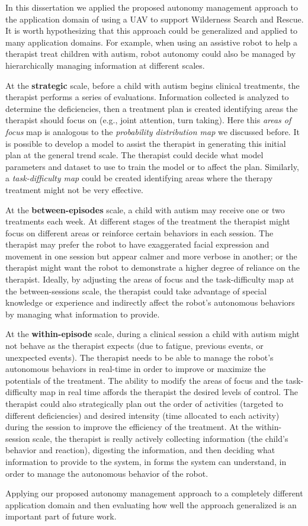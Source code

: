 In this dissertation we applied the proposed autonomy management approach to the application domain of using a UAV to support Wilderness Search and Rescue. It is worth hypothesizing that this approach could be generalized and applied to many application domains. For example, when using an assistive robot to help a therapist treat children with autism, robot autonomy could also be managed by hierarchically managing information at different scales. 

At the \textbf{strategic} scale, before a child with autism begins clinical treatments, the therapist performs a series of evaluations. Information collected is analyzed to determine the deficiencies, then a treatment plan is created identifying areas the therapist should focus on (e.g., joint attention, turn taking). Here this 
\textit{areas of focus} map is analogous to the \textit{probability distribution map} we discussed before. It is possible to develop a model to assist the therapist in generating this initial plan at the general trend scale. The therapist could decide what model parameters and dataset to use to train the model or to affect the plan. Similarly, a \textit{task-difficulty map} could be created identifying areas where the therapy treatment might not be very effective.

At the \textbf{between-episodes} scale, a child with autism may receive one or two treatments each week. At different stages of the treatment the therapist might focus on different areas or reinforce certain behaviors in each session. The therapist may prefer the robot to have exaggerated facial expression and movement in one session but appear calmer and more verbose in another; or the therapist might want the robot to demonstrate a higher degree of reliance on the therapist. Ideally, by adjusting the areas of focus and the task-difficulty map at the between-sessions scale, the therapist could take advantage of special knowledge or experience and indirectly affect the robot's autonomous behaviors by managing what information to provide.

At the \textbf{within-episode} scale, during a clinical session a child with autism might not behave as the therapist expects (due to fatigue, previous events, or unexpected events). The therapist needs to be able to manage the robot's autonomous behaviors in real-time in order to improve or maximize the potentials of the treatment. The ability to modify the areas of focus and the task-difficulty map in real time affords the therapist the desired levels of control. The therapist could also strategically plan out the order of activities (targeted to different deficiencies) and desired intensity (time allocated to each activity) during the session to improve the efficiency of the treatment. At the within-session scale, the therapist is really actively collecting information (the child's behavior and reaction), digesting the information, and then deciding what information to provide to the system, in forms the system can understand, in order to manage the autonomous behavior of the robot.

Applying our proposed autonomy management approach to a completely different application domain and then evaluating how well the approach generalized is an important part of future work.